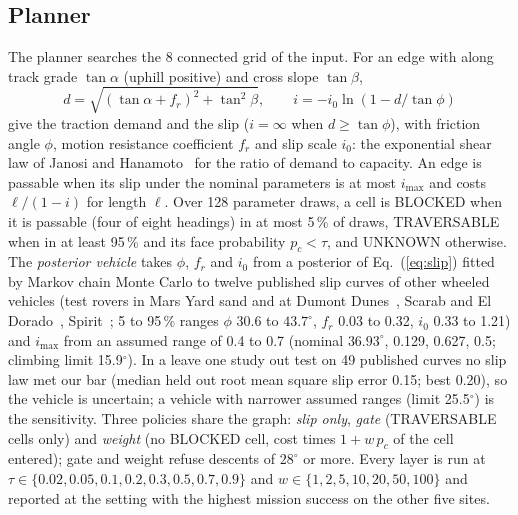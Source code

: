 \documentclass[conference]{IEEEtran}
\begin{document}
\subsection{Planner}\label{sec:planner}
The planner searches the 8 connected grid of the input. For an edge with along track grade $\tan\alpha$ (uphill positive) and cross slope $\tan\beta$,
\begin{equation}
d=\sqrt{(\tan\alpha+f_r)^2+\tan^2\beta},\qquad i=-i_0\ln\left(1-d/\tan\phi\right)
\label{eq:slip}
\end{equation}
give the traction demand and the slip ($i=\infty$ when $d\ge\tan\phi$), with friction angle $\phi$, motion resistance coefficient $f_r$ and slip scale $i_0$: the exponential shear law of Janosi and Hanamoto~\cite{janosi1961} for the ratio of demand to capacity. An edge is passable when its slip under the nominal parameters is at most $i_{\max}$ and costs $\ell/(1-i)$ for length $\ell$. Over 128 parameter draws, a cell is BLOCKED when it is passable (four of eight headings) in at most 5\,\% of draws, TRAVERSABLE when in at least 95\,\% and its face probability $p_c<\tau$, and UNKNOWN otherwise. The \emph{posterior vehicle} takes $\phi$, $f_r$ and $i_0$ from a posterior of Eq.~(\ref{eq:slip}) fitted by Markov chain Monte Carlo to twelve published slip curves of other wheeled vehicles (test rovers in Mars Yard sand and at Dumont Dunes~\cite{heverly2013}, Scarab and El Dorado~\cite{inotsume2016thesis}, Spirit~\cite{li2008spirit}; 5 to 95\,\% ranges $\phi$ 30.6 to $43.7^\circ$, $f_r$ 0.03 to 0.32, $i_0$ 0.33 to 1.21) and $i_{\max}$ from an assumed range of 0.4 to 0.7 (nominal $36.93^\circ$, 0.129, 0.627, 0.5; climbing limit 15.9$^\circ$). In a leave one study out test on 49 published curves no slip law met our bar (median held out root mean square slip error 0.15; best 0.20), so the vehicle is uncertain; a vehicle with narrower assumed ranges (limit 25.5$^\circ$) is the sensitivity. Three policies share the graph: \emph{slip only}, \emph{gate} (TRAVERSABLE cells only) and \emph{weight} (no BLOCKED cell, cost times $1+w\,p_c$ of the cell entered); gate and weight refuse descents of $28^\circ$ or more. Every layer is run at $\tau\in\{0.02,0.05,0.1,0.2,0.3,0.5,0.7,0.9\}$ and $w\in\{1,2,5,10,20,50,100\}$ and reported at the setting with the highest mission success on the other five sites.
\end{document}
